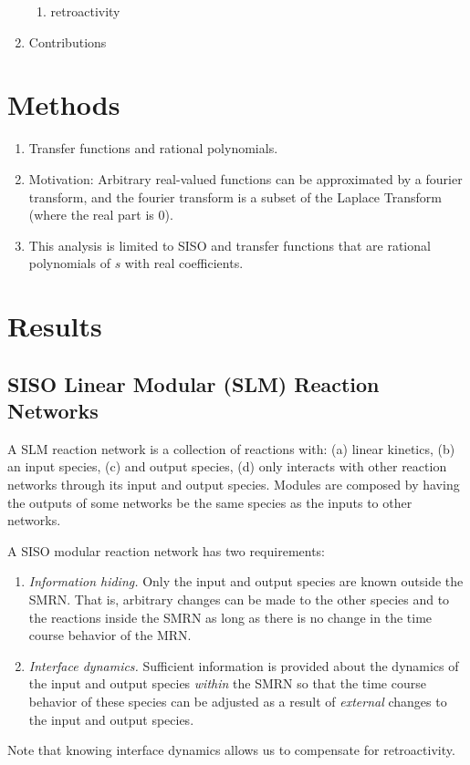 \documentclass[unnumsec,webpdf,contemporary,large]{oup-authoring-template}%
\theoremstyle{thmstyleone}%
\theoremstyle{thmstyletwo}%
\theoremstyle{thmstylethree}%
\begin{document}
\begin{enumerate}
\begin{enumerate}
\item
retroactivity
\end{enumerate}

\item Contributions
\end{enumerate}



\section{Methods}\label{methods}
\begin{enumerate}
\item
Transfer functions and rational polynomials.
\item
Motivation: 
Arbitrary real-valued functions can be approximated by a fourier transform,
and the fourier transform is a subset of the Laplace Transform (where the real part is 0).
\item
This analysis is limited to SISO and transfer functions that
are rational polynomials of $s$ with real coefficients.
\end{enumerate}



\section{Results}\label{results}
\subsection{SISO Linear Modular (SLM) Reaction Networks}
A SLM reaction network is a collection of reactions with:
(a) linear kinetics,
(b) an input species,
(c) and output species,
(d) only interacts with other reaction networks through
its input and output species.
Modules are composed by having the outputs of some networks be the
same species as the inputs to other networks.

A SISO modular reaction network has two requirements:
\begin{enumerate}
\item
{\em Information hiding.} Only the input and output species are known outside the SMRN. That is, arbitrary changes can be made
to the other species and to the reactions inside the SMRN as long as there is no change in the time course behavior of the MRN.
\item
{\em Interface dynamics.} Sufficient information is provided about the dynamics of the input and output species {\em within} the SMRN so
that the time course behavior of these species
can be adjusted as a result of {\em external} changes to the input and output species.
\end{enumerate}
Note that knowing interface dynamics allows us to compensate for retroactivity.
\end{document}
